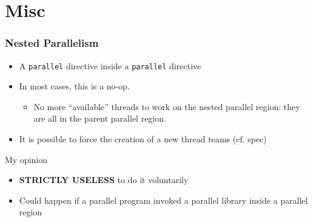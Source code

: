 \documentclass{beamer}
\begin{document}
\section{Misc}


\begin{frame}
  \frametitle{Nested Parallelism}


  \begin{itemize}
\item A \texttt{parallel} directive inside a \texttt{parallel} directive

\medskip
  
\item In most cases, this is a no-op.
  \begin{itemize}
  \item No more ``available'' threads to work on the nested parallel region:
    they are all in the parent parallel region.
  \end{itemize}

  \medskip

\item It is possible to force the creation of a new thread teams (cf. spec)
  
\end{itemize}

\begin{alertblock}{My opinion}
  \begin{itemize}
  \item \textbf{STRICTLY USELESS} to do it voluntarily
  \item Could happen if a parallel program invoked a parallel library inside a parallel region
  \end{itemize}
\end{alertblock}
\end{frame}
\end{document}
